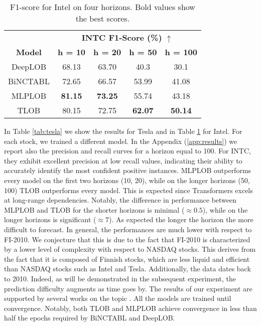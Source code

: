 \begin{table}[h!]
\centering
\begin{minipage}{0.48\textwidth}
\centering
\caption{F1-score for Intel on four horizons. Bold values show the best scores.} 
\label{tab:intel}
\centering
        \begin{tabular}{c|cccc}
            \toprule
            & \multicolumn{4}{c}{\textbf{INTC F1-Score (\%) }$\uparrow$} \\
            \cmidrule(lr){2-5} 
            \textbf{Model} & \textbf{h = 10} & \textbf{h = 20} & \textbf{h = 50} & \textbf{h = 100}  \\
            \midrule
            DeepLOB & 68.13 & 63.70 & 40.3 & 30.1 \\
            BiNCTABL & 72.65 & 66.57 & 53.99 & 41.08 \\
            \midrule
            MLPLOB & \textbf{81.15} & \textbf{73.25} & 55.74 & 43.18 \\
            TLOB & 80.15 & 72.75 & \textbf{62.07} & \textbf{50.14} \\
            \bottomrule
        \end{tabular}
        \end{minipage}
\end{table}

In Table \ref{tab:tesla} we show the results for Tesla and in Table \ref{tab:intel} for Intel.
For each stock, we trained a different model. 
In the Appendix (\ref{app:results}) we report also the precision and recall curves for a horizon equal to 100. For INTC, they exhibit excellent precision at low recall values, indicating their ability to accurately identify the most confident positive instances.
MLPLOB outperforms every model on the first two horizons (10, 20), while on the longer horizons (50, 100) TLOB outperforms every model. This is expected since Transformers excels at long-range dependencies. 
Notably, the difference in performance between MLPLOB and TLOB for the shorter horizons is minimal ($\approx 0.5$), while on the longer horizons is significant ($\approx 7$). As expected the longer the horizon the more difficult to forecast.
In general, the performances are much lower with respect to FI-2010. We conjecture that this is due to the fact that FI-2010 is characterized by a lower level of complexity with respect to NASDAQ stocks. This derives from the fact that it is composed of Finnish stocks, which are less liquid and efficient than NASDAQ stocks such as Intel and Tesla. Additionally, the data dates back to 2010. Indeed, as will be demonstrated in the subsequent experiment, the prediction difficulty augments as time goes by. The results of our experiment are supported by several works on the topic \cite{prata2024lob, zhang2019deeplob, sirignano2019deep}. 
All the models are trained until convergence. Notably, both TLOB and MLPLOB achieve convergence in less than half the epochs required by BiNCTABL and DeepLOB.


